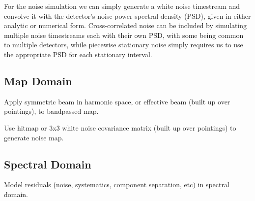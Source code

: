 For the noise simulation we can simply generate a white noise timestream and convolve it with the detector's noise power spectral density (PSD), given in either analytic or numerical form. Cross-correlated noise can be included by simulating multiple noise timestreams each with their own PSD, with some being common to multiple detectors, while piecewise stationary noise simply requires us to use the appropriate PSD for each stationary interval.

\subsection{Map Domain}

Apply symmetric beam in harmonic space, or effective beam (built up over pointings), to bandpassed map.

Use hitmap or 3x3 white noise covariance matrix (built up over pointings) to generate noise map.

\subsection{Spectral Domain}

Model residuals (noise, systematics, component separation, etc) in spectral domain.

%



